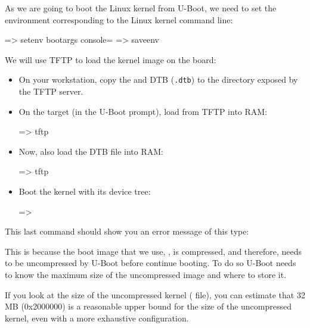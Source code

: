 As we are going to boot the Linux kernel from U-Boot,
we need to set the  environment corresponding
to the Linux kernel command line:

\begin{ubootinput}
=> setenv bootargs console=%
=> saveenv
\end{ubootinput}
We will use TFTP to load the kernel image on the board:

\begin{itemize}

\item On your workstation, copy the {\tt {}} and DTB
(\texttt{\dtname}\texttt{.dtb}) to the directory exposed by the TFTP server.

\item On the target (in the U-Boot prompt), load {\tt {}} from
TFTP into RAM:
\begin{ubootinput}
=> tftp %
\end{ubootinput}

\item Now, also load the DTB file into RAM:
\begin{ubootinput}
=> tftp %
\end{ubootinput}

\item Boot the kernel with its device tree:
\begin{ubootinput}
=> %
\end{ubootinput}

\end{itemize}

\if{}
This last command should show you an error message of this type:

This is because the boot image that we use, , is compressed, and
therefore, needs to be uncompressed by U-Boot before continue booting. To do so
U-Boot needs to know the maximum size of the uncompressed image and where to
store it.

If you look at the size of the uncompressed kernel ( file),
you can estimate that 32 MB (0x2000000) is a reasonable upper bound
for the size of the uncompressed kernel, even with a more exhaustive
configuration.

